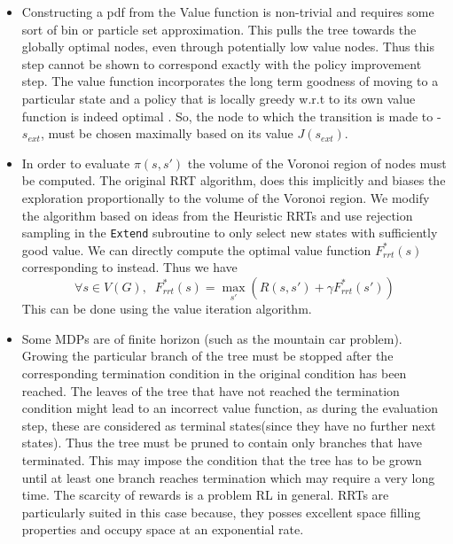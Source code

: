 \documentclass[wcp]{jmlr}
\begin{document}
\begin{itemize} 
\item Constructing a pdf from the Value function is non-trivial and requires some sort of bin or particle set approximation. This pulls the tree towards the globally optimal nodes, even through potentially low value nodes. Thus this step cannot be shown to correspond exactly with the  policy improvement step. The value function incorporates the long term goodness of moving to a particular state and a policy that is locally greedy w.r.t to its own value function is indeed optimal \citep{rlbook}. So, the node to which the transition is made to - $s_{ext}$, must be chosen maximally based on its value $J(s_{ext})$.  

\item In order to evaluate $\pi(s,s')$ the volume of the Voronoi region of nodes must be computed. The original RRT algorithm, does this implicitly and biases the exploration proportionally to the volume of the Voronoi region. We modify the algorithm based on ideas from the Heuristic RRTs \citep{heuristicrrt} and use rejection sampling in the \texttt{Extend} subroutine to only select new states with sufficiently good value. We can directly compute the optimal value function $F_{rrt}^*(s)$ corresponding to  instead. Thus we have
\begin{equation}
\label{eq:polmax}
\forall s \in V(G),\;\; F_{rrt}^*(s) = \max_{s'}( R(s,s') + \gamma F_{rrt}^*(s'))
\end{equation}
This can be done using the value iteration algorithm.


\item Some MDPs are of finite horizon (such as the mountain car problem). Growing the particular branch of the tree must be stopped after the corresponding termination condition in the original condition has been reached. The leaves of the tree that have not reached the termination condition might lead to an incorrect value function, as during the evaluation step, these are considered as terminal states(since they have no further next states). Thus the tree must be pruned to contain only branches that have terminated. This may impose the condition that the tree has to be grown until at least one branch reaches termination which may require a very long time. The scarcity of rewards is a problem RL in general. RRTs are particularly suited in this case because, they posses excellent space filling properties and occupy space at an exponential rate.


\end{itemize}
\end{document}
